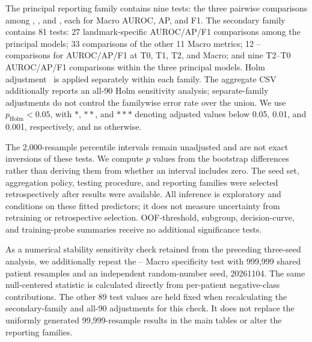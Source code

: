 The principal reporting family contains nine tests: the three pairwise comparisons among \nojepa{}, \direct{}, and \fullmodel{}, each for Macro AUROC, AP, and F1. The secondary family contains 81 tests: 27 landmark-specific AUROC/AP/F1 comparisons among the principal models; 33 comparisons of the other 11 Macro metrics; 12 \fullmodel{}--\meanmodel{} comparisons for AUROC/AP/F1 at T0, T1, T2, and Macro; and nine T2--T0 AUROC/AP/F1 comparisons within the three principal models. Holm adjustment~\citep{holm1979} is applied separately within each family. The aggregate CSV additionally reports an all-90 Holm sensitivity analysis; separate-family adjustments do not control the familywise error rate over the union. We use $p_{\mathrm{Holm}}<0.05$, with $*$, $**$, and $***$ denoting adjusted values below 0.05, 0.01, and 0.001, respectively, and ns otherwise.

The 2,000-resample percentile intervals remain unadjusted and are not exact inversions of these tests. We compute $p$ values from the bootstrap differences rather than deriving them from whether an interval includes zero. The seed set, aggregation policy, testing procedure, and reporting families were selected retrospectively after results were available. All inference is exploratory and conditions on these fitted predictors; it does not measure uncertainty from retraining or retrospective selection. OOF-threshold, subgroup, decision-curve, and training-probe summaries receive no additional significance tests.


As a numerical stability sensitivity check retained from the preceding three-seed analysis, we additionally repeat the \fullmodel{}--\direct{} Macro specificity test with 999,999 shared patient resamples and an independent random-number seed, 20261104. The same null-centered statistic is calculated directly from per-patient negative-class contributions. The other 89 test values are held fixed when recalculating the secondary-family and all-90 adjustments for this check. It does not replace the uniformly generated 99,999-resample results in the main tables or alter the reporting families.

